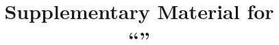 \documentclass[\PaperMode]{IEEEtran}
\begin{document}
\title{Supplementary Material for\\ ``\PaperTitle''}
\PaperAuthors
\PaperHeader

\maketitle







\end{document}
